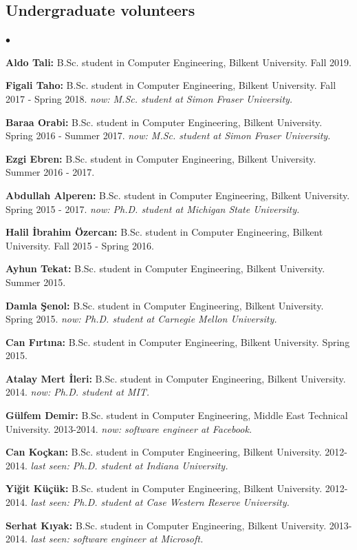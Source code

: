 \documentclass[margin,line]{res}
\newenvironment{list2}{
  \begin{list}{$\bullet$}{%
      \setlength{\itemsep}{0.1cm}
      \setlength{\parsep}{0in} \setlength{\parskip}{0in}
      \setlength{\topsep}{0in} \setlength{\partopsep}{0in} 
      \setlength{\leftmargin}{0.2in}}}{\end{list}}
\begin{document}
\begin{resume}
\subsection{\small \sc Undergraduate volunteers}
\begin{list2}
  \item {\bf Aldo Tali:} B.Sc. student in Computer Engineering,  Bilkent University. Fall 2019.
\item {\bf Figali Taho:} B.Sc. student in Computer Engineering,  Bilkent University. Fall 2017 - Spring 2018. {\it now: M.Sc. student at Simon Fraser University.}
\item {\bf Baraa Orabi:} B.Sc. student in Computer Engineering,  Bilkent University. Spring 2016 - Summer 2017. {\it now: M.Sc. student at Simon Fraser University.}
\item {\bf Ezgi Ebren:} B.Sc. student in Computer Engineering,  Bilkent University. Summer 2016 - 2017.
\item {\bf Abdullah Alperen:} B.Sc. student in Computer Engineering,  Bilkent University. Spring 2015 - 2017. {\it now: Ph.D. student at Michigan State University.}
\item {\bf Halil İbrahim Özercan:} B.Sc. student in Computer Engineering,  Bilkent University. Fall 2015 - Spring 2016. 
\item {\bf Ayhun Tekat:} B.Sc. student in Computer Engineering,  Bilkent University. Summer 2015. 
\item {\bf Damla Şenol:} B.Sc. student in Computer Engineering,  Bilkent University. Spring 2015. {\it now: Ph.D. student at Carnegie Mellon University.}
\item {\bf Can Fırtına:} B.Sc. student in Computer Engineering,  Bilkent University. Spring 2015. 
\item {\bf Atalay Mert İleri:} B.Sc. student in Computer Engineering, Bilkent University. 2014. {\it now: Ph.D. student at MIT.}
\item {\bf Gülfem Demir:} B.Sc. student in Computer Engineering,  Middle East Technical University. 2013-2014. {\it now: software engineer at Facebook.}
\item {\bf Can Koçkan:} B.Sc. student in Computer Engineering,  Bilkent University.  2012-2014. {\it last seen: Ph.D. student at Indiana University.}
\item {\bf Yiğit Küçük:} B.Sc. student in Computer Engineering,  Bilkent University. 2012-2014. {\it last seen: Ph.D. student at Case Western Reserve University.}
\item {\bf Serhat Kıyak:} B.Sc. student in Computer Engineering,  Bilkent University. 2013-2014. {\it last seen: software engineer at Microsoft.}
\end{list2}



\end{resume}
\end{document}
